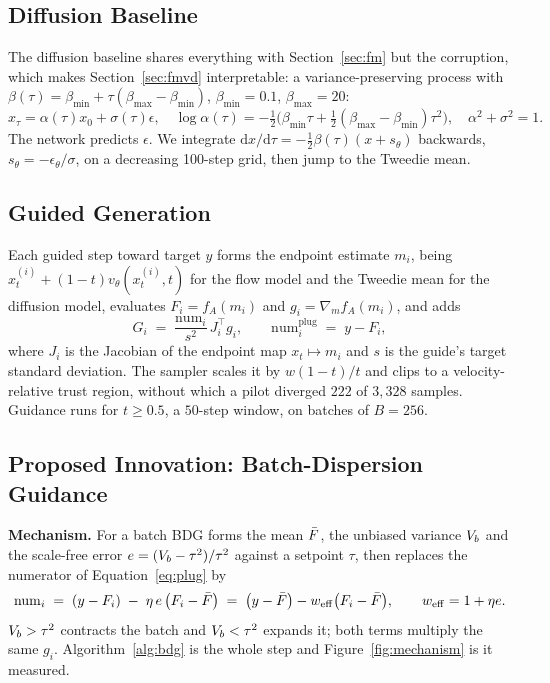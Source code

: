 \subsection{Diffusion Baseline}
\label{sec:diff}

The diffusion baseline shares everything with Section~\ref{sec:fm} but the corruption,
which makes Section~\ref{sec:fmvd} interpretable: a variance-preserving process with
$\beta(\tau)=\beta_{\min}+\tau(\beta_{\max}-\beta_{\min})$, $\beta_{\min}=0.1$,
$\beta_{\max}=20$:
\begin{equation}
x_\tau=\alpha(\tau)x_0+\sigma(\tau)\epsilon,
\quad
\log\alpha(\tau)=-\tfrac12\big(\beta_{\min}\tau+\tfrac12(\beta_{\max}-\beta_{\min})\tau^2\big),
\quad \alpha^2+\sigma^2=1 .
\label{eq:vp}
\end{equation}
The network predicts $\epsilon$. We integrate
$\mathrm{d}x/\mathrm{d}\tau=-\tfrac12\beta(\tau)(x+s_\theta)$ backwards,
$s_\theta=-\epsilon_\theta/\sigma$, on a decreasing 100-step grid, then jump to the
Tweedie mean.

\subsection{Guided Generation}
\label{sec:guidance}

Each guided step toward target $y$ forms the endpoint estimate $m_i$, being
$x_t^{(i)}+(1-t)v_\theta(x_t^{(i)},t)$ for the flow model and the Tweedie mean for the
diffusion model, evaluates $F_i=f_A(m_i)$ and $g_i=\nabla_m f_A(m_i)$, and adds
\begin{equation}
G_i \;=\; \frac{\mathrm{num}_i}{s^2}\,J_i^{\!\top} g_i ,
\qquad
\mathrm{num}_i^{\mathrm{plug}} \;=\; y - F_i ,
\label{eq:plug}
\end{equation}
where $J_i$ is the Jacobian of the endpoint map $x_t\!\mapsto\!m_i$ and $s$ is the
guide's target standard deviation. The
sampler scales it by $w(1-t)/t$ and clips to a velocity-relative trust region, without
which a pilot diverged $222$ of $3{,}328$ samples. Guidance runs for
$t\ge0.5$, a $50$-step window, on batches of $B=256$.

\subsection{Proposed Innovation: Batch-Dispersion Guidance}
\label{sec:bdg}

\textbf{Mechanism.} For a batch BDG forms the mean $\bar{F}$, the unbiased variance $V_{b}$
and the scale-free error $e=(V_{b}-\tau^2)/\tau^2$ against a setpoint $\tau$, then
replaces the numerator of Equation~\eqref{eq:plug} by
\begin{equation}
\mathrm{num}_i \;=\; (y-F_i)\;-\;\eta\,e\,\big(F_i-\bar{F}\big)
\;=\;\big(y-\bar{F}\big)-w_{\mathrm{eff}}\big(F_i-\bar{F}\big),
\qquad w_{\mathrm{eff}}=1+\eta e .
\label{eq:bdgnum}
\end{equation}
$V_{b}>\tau^2$ contracts the batch and $V_{b}<\tau^2$ expands it; both terms multiply the
same $g_i$. Algorithm~\ref{alg:bdg} is the whole step
and Figure~\ref{fig:mechanism} is it measured.

